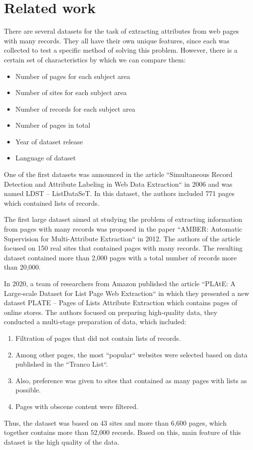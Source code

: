 \section{Related work}

There are several datasets for the task of extracting attributes from web pages with many records. They all have their own unique features, since each was collected to test a specific method of solving this problem. However, there is a certain set of characteristics by which we can compare them:
\begin{itemize}
    \item Number of pages for each subject area
    \item Number of sites for each subject area
    \item Number of records for each subject area
    \item Number of pages in total
    \item Year of dataset release
    \item Language of dataset
\end{itemize}

One of the first datasets was announced in the article ``Simultaneous Record Detection and Attribute Labeling in Web Data Extraction``\cite{zhu_simultaneous_2006} in 2006 and was named LDST -- ListDataSeT. In this dataset, the authors included 771 pages which contained lists of records.

The first large dataset aimed at studying the problem of extracting information from pages with many records was proposed in the paper ``AMBER: Automatic Supervision for Multi-Attribute Extraction``\cite{furche_amber_2012} in 2012. The authors of the article focused on 150 real sites that contained pages with many records. The resulting dataset contained more than 2,000 pages with a total number of records more than 20,000.

In 2020, a team of researchers from Amazon published the article ``PLAtE: A Large-scale Dataset for List Page Web Extraction``\cite{san_plate_2023} in which they presented a new dataset PLATE -- Pages of Lists Attribute Extraction which contains pages of online stores. The authors focused on preparing high-quality data, they conducted a multi-stage preparation of data, which included:
\begin{enumerate}
 \item Filtration of pages that did not contain lists of records.
 \item Among other pages, the most ``popular`` websites were selected based on data published in the ``Tranco List``.
 \item Also, preference was given to sites that contained as many pages with lists as possible.
 \item Pages with obscene content were filtered.
\end{enumerate}
Thus, the dataset was based on 43 sites and more than 6,600 pages, which together contains more than 52,000 records. Based on this, main feature of this dataset is the high quality of the data.

